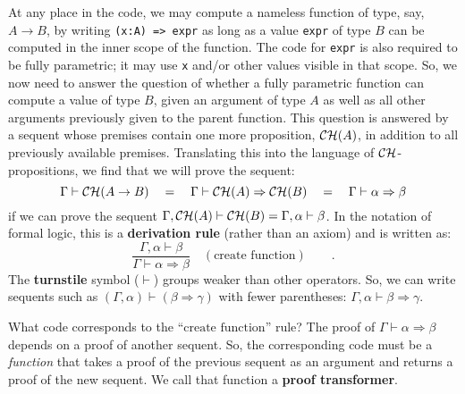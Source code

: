 At any place in the code, we may compute a nameless function of type,
say, $A\rightarrow B$, by writing \lstinline!(x:A) => expr! as long
as a value \lstinline!expr! of type $B$ can be computed in the inner
scope of the function. The code for \lstinline!expr! is also required
to be fully parametric; it may use \lstinline!x! and/or other values
visible in that scope. So, we now need to answer the question of whether
a fully parametric function can compute a value of type $B$, given
an argument of type $A$ as well as all other arguments previously
given to the parent function. This question is answered by a sequent
whose premises contain one more proposition, ${\cal CH}(A)$, in addition
to all previously available premises. Translating this into the language
of ${\cal CH}$-propositions, we find that we will prove the sequent:
\[
\Gamma\vdash{\cal CH}(A\rightarrow B)\quad=\quad\Gamma\vdash{\cal CH}(A)\Rightarrow{\cal CH}(B)\quad=\quad\Gamma\vdash\alpha\Rightarrow\beta
\]
if we can prove the sequent $\Gamma,{\cal CH}(A)\vdash{\cal CH}(B)=\Gamma,\alpha\vdash\beta$.
In the notation of formal logic, this is a \textbf{derivation rule}
(rather than an axiom) and is written as:
\[
\frac{\Gamma,\alpha\vdash\beta}{\Gamma\vdash\alpha\Rightarrow\beta}\quad(\text{create function})\quad\quad.
\]
The \textbf{turnstile}
symbol ($\vdash$) groups weaker than other operators. So, we can
write sequents such as $(\Gamma,\alpha)\vdash(\beta\Rightarrow\gamma)$
with fewer parentheses: $\Gamma,\alpha\vdash\beta\Rightarrow\gamma$.

What code corresponds to the \textsf{``}$\text{create function}$\textsf{''} rule?
The proof of $\Gamma\vdash\alpha\Rightarrow\beta$ depends on a proof
of another sequent. So, the corresponding code must be a \emph{function}
that takes a proof of the previous sequent as an argument and returns
a proof of the new sequent. We call that function a \textbf{proof
transformer}.

